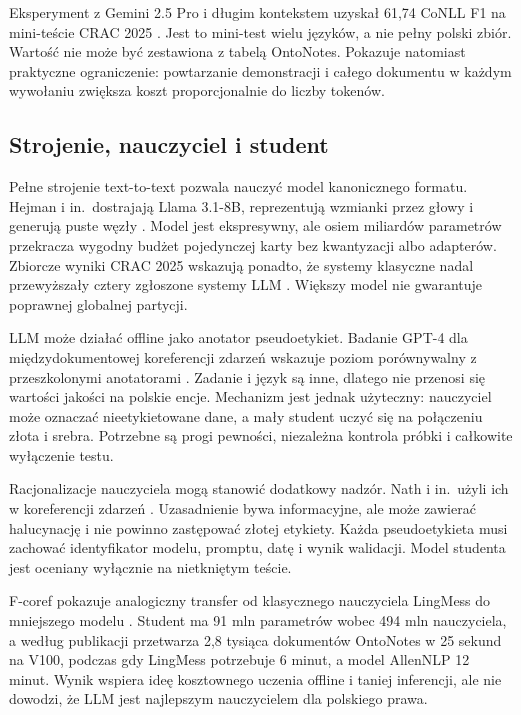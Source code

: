 Eksperyment z Gemini 2.5 Pro i długim kontekstem uzyskał 61,74 CoNLL F1 na mini-teście CRAC 2025 \cite{sajid_2025_fewshot}. Jest to mini-test wielu języków, a nie pełny polski zbiór. Wartość nie może być zestawiona z tabelą OntoNotes. Pokazuje natomiast praktyczne ograniczenie: powtarzanie demonstracji i całego dokumentu w każdym wywołaniu zwiększa koszt proporcjonalnie do liczby tokenów.

\subsection{Strojenie, nauczyciel i student}

Pełne strojenie text-to-text pozwala nauczyć model kanonicznego formatu. Hejman i in.\ dostrajają Llama 3.1-8B, reprezentują wzmianki przez głowy i generują puste węzły \cite{hejman_2025_llama}. Model jest ekspresywny, ale osiem miliardów parametrów przekracza wygodny budżet pojedynczej karty bez kwantyzacji albo adapterów. Zbiorcze wyniki CRAC 2025 wskazują ponadto, że systemy klasyczne nadal przewyższały cztery zgłoszone systemy LLM \cite{novak_2025_crac}. Większy model nie gwarantuje poprawnej globalnej partycji.

LLM może działać offline jako anotator pseudoetykiet. Badanie GPT-4 dla międzydokumentowej koreferencji zdarzeń wskazuje poziom porównywalny z przeszkolonymi anotatorami \cite{zhao_2023_gpt}. Zadanie i język są inne, dlatego nie przenosi się wartości jakości na polskie encje. Mechanizm jest jednak użyteczny: nauczyciel może oznaczać nieetykietowane dane, a mały student uczyć się na połączeniu złota i srebra. Potrzebne są progi pewności, niezależna kontrola próbki i całkowite wyłączenie testu.

Racjonalizacje nauczyciela mogą stanowić dodatkowy nadzór. Nath i in.\ użyli ich w koreferencji zdarzeń \cite{nath_2024_rationale}. Uzasadnienie bywa informacyjne, ale może zawierać halucynację i nie powinno zastępować złotej etykiety. Każda pseudoetykieta musi zachować identyfikator modelu, promptu, datę i wynik walidacji. Model studenta jest oceniany wyłącznie na nietkniętym teście.

F-coref pokazuje analogiczny transfer od klasycznego nauczyciela LingMess do mniejszego modelu \cite{otmazgin_2022_fcoref}. Student ma 91 mln parametrów wobec 494 mln nauczyciela, a według publikacji przetwarza 2,8 tysiąca dokumentów OntoNotes w 25 sekund na V100, podczas gdy LingMess potrzebuje 6 minut, a model AllenNLP 12 minut. Wynik wspiera ideę kosztownego uczenia offline i taniej inferencji, ale nie dowodzi, że LLM jest najlepszym nauczycielem dla polskiego prawa.

